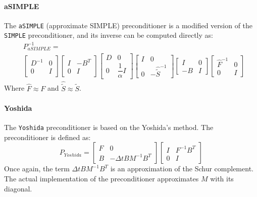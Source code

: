 \paragraph{aSIMPLE}
The \texttt{aSIMPLE} (approximate SIMPLE) preconditioner is a modified version of the \texttt{SIMPLE} preconditioner, and its inverse can be computed directly as:
\begin{equation}
    \begin{split}
        & P_{aSIMPLE}^{-1} = \\
        & \begin{bmatrix}
            D^{-1} & 0 \\
            0 & I
        \end{bmatrix}
        \begin{bmatrix}
            I & -B^T \\
            0 & I
        \end{bmatrix}
        \begin{bmatrix}
            D & 0 \\
            0 & \dfrac{1}{\alpha}I
        \end{bmatrix} 
        \begin{bmatrix}
            I & 0 \\
            0 & -\hat{\tilde{S}}^{-1}
        \end{bmatrix}
        \begin{bmatrix}
            I & 0 \\
            -B & I
        \end{bmatrix}
        \begin{bmatrix}
            \hat{F}^{-1} & 0 \\
            0 & I
        \end{bmatrix}
    \end{split}
\end{equation}
Where $\hat{F} \approx F$ and $\hat{\tilde{S}} \approx \tilde{S}$.

\paragraph{Yoshida}
The \texttt{Yoshida} preconditioner is based on the Yoshida's method. The preconditioner is defined as:
\begin{equation}
    P_{Yoshida} = \begin{bmatrix}
        F & 0 \\
        B & -\Delta t B M^{-1} B^T 
    \end{bmatrix}
    \begin{bmatrix}
        I & F^{-1} B^T \\
        0 & I
    \end{bmatrix}
\end{equation}
Once again, the term $\Delta t B M^{-1} B^T$ is an approximation of the Schur complement. The actual implementation of the preconditioner approximates $M$ with its diagonal.

